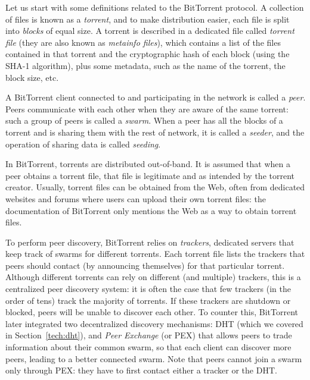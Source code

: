 \documentclass[mscthesis]{usiinfthesis}
\begin{document}
Let us start with some definitions related to the BitTorrent protocol. A collection of files is known as a \emph{torrent}, and to make distribution easier, each file is split into \emph{blocks} of equal size. A torrent is described in a dedicated file called \emph{torrent file} (they are also known as \textit{metainfo files}), which contains a list of the files contained in that torrent and the cryptographic hash of each block (using the SHA-1 algorithm), plus some metadata, such as the name of the torrent, the block size, etc.

A BitTorrent client connected to and participating in the network is called a \emph{peer}. Peers communicate with each other when they are aware of the same torrent: such a group of peers is called a \emph{swarm}. When a peer has all the blocks of a torrent and is sharing them with the rest of network, it is called a \emph{seeder}, and the operation of sharing data is called \textit{seeding}.

In BitTorrent, torrents are distributed out-of-band. It is assumed that when a peer obtains a torrent file, that file is legitimate and as intended by the torrent creator. Usually, torrent files can be obtained from the Web, often from dedicated websites and forums where users can upload their own torrent files: the documentation of BitTorrent only mentions the Web as a way to obtain torrent files.

To perform peer discovery, BitTorrent relies on \emph{trackers}, dedicated servers that keep track of swarms for different torrents. Each torrent file lists the trackers that peers should contact (by announcing themselves) for that particular torrent. Although different torrents can rely on different (and multiple) trackers, this is a centralized peer discovery system: it is often the case that few trackers (in the order of tens) track the majority of torrents. If these trackers are shutdown or blocked, peers will be unable to discover each other. To counter this, BitTorrent later integrated two decentralized discovery mechanisms: DHT (which we covered in Section~\ref{tech:dht}), and \emph{Peer Exchange} (or PEX) that allows peers to trade information about their common swarm, so that each client can discover more peers, leading to a better connected swarm. Note that peers cannot join a swarm only through PEX: they have to first contact either a tracker or the DHT.
\end{document}
